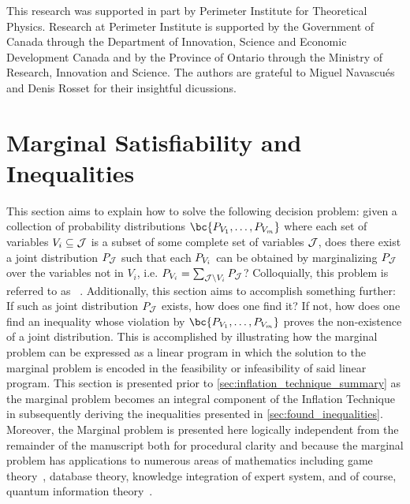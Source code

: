 \documentclass[aps, 10pt, english, twoside, pra, nofootinbib, tightenlines, longbibliography, superscriptaddress]{revtex4-1}
\begin{document}
    \begin{acknowledgments}
    This research was supported in part by Perimeter Institute for Theoretical Physics. Research at Perimeter Institute is supported by the Government of Canada through the Department of Innovation, Science and Economic Development Canada and by the Province of Ontario through the Ministry of Research, Innovation and Science. The authors are grateful to Miguel Navascués and Denis Rosset for their insightful dicussions.
    \end{acknowledgments}

    \appendix

    \section{Marginal Satisfiability and Inequalities}
    \label{sec:marginal_satisfiability}

    This section aims to explain how to solve the following decision problem: given a collection of probability distributions $\bc{\prob[V_1], \ldots, \prob[V_m]}$ where each set of variables $V_{i} \subseteq \mathcal{J}$ is a subset of some complete set of variables $\mathcal{J}$, does there exist a joint distribution $\prob[\jointvar]$ such that each $\prob[V_i]$ can be obtained by marginalizing $\prob[\jointvar]$ over the variables not in $V_i$, i.e. $\prob[V_i] = \sum_{\jointvar \setminus V_i} \prob[\jointvar]$? Colloquially, this problem is referred to as ~\cite{Fritz_2011}. Additionally, this section aims to accomplish something further: If such as joint distribution $\prob[\jointvar]$ exists, how does one find it? If not, how does one find an inequality whose violation by $\bc{\prob[V_1], \ldots, \prob[V_m]}$ proves the non-existence of a joint distribution. This is accomplished by illustrating how the marginal problem can be expressed as a linear program in which the solution to the marginal problem is encoded in the feasibility or infeasibility of said linear program. This section is presented prior to \cref{sec:inflation_technique_summary} as the marginal problem becomes an integral component of the Inflation Technique in subsequently deriving the inequalities presented in \cref{sec:found_inequalities}. Moreover, the Marginal problem is presented here logically independent from the remainder of the manuscript both for procedural clarity and because the marginal problem has applications to numerous areas of mathematics including game theory~\cite{Vorobev_1962}, database theory, knowledge integration of expert system, and of course, quantum information theory~\cite{Fritz_2011}.
\end{document}
